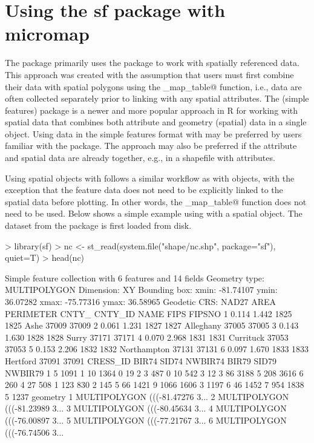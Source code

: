 \documentclass{article}
\begin{document}
\section{Using the sf package with micromap}

The \verb@micromap@ package primarily uses the \verb@sp@ package to work with spatially referenced data. This approach was created with the assumption that \verb@micromap@ users must first combine their data with spatial polygons using the \verb@create_map_table@ function, i.e., data are often collected separately prior to linking with any spatial attributes. The \verb@sf@ (simple features) package is a newer and more popular approach in R for working with spatial data that combines both attribute and geometry (spatial) data in a single object. Using data in the simple features format with \verb@micromap@ may be preferred by users familiar with the package.  The approach may also be preferred if the attribute and spatial data are already together, e.g., in a shapefile with attributes.

Using \verb@sf@ spatial objects with \verb@micromap@ follows a similar workflow as with \verb@sp@ objects, with the exception that the feature data does not need to be explicitly linked to the spatial data before plotting.  In other words, the \verb@create_map_table@ function does not need to be used.  Below shows a simple example using \verb@micromap@ with a \verb@sf@ spatial object. The \verb@nc@ dataset from the \verb@sf@ package is first loaded from disk. 

\begin{Schunk}
\begin{Sinput}
> library(sf)
> nc <- st_read(system.file("shape/nc.shp", package="sf"), quiet=T)
> head(nc)
\end{Sinput}
\begin{Soutput}
Simple feature collection with 6 features and 14 fields
Geometry type: MULTIPOLYGON
Dimension:     XY
Bounding box:  xmin: -81.74107 ymin: 36.07282 xmax: -75.77316 ymax: 36.58965
Geodetic CRS:  NAD27
   AREA PERIMETER CNTY_ CNTY_ID        NAME  FIPS FIPSNO
1 0.114     1.442  1825    1825        Ashe 37009  37009
2 0.061     1.231  1827    1827   Alleghany 37005  37005
3 0.143     1.630  1828    1828       Surry 37171  37171
4 0.070     2.968  1831    1831   Currituck 37053  37053
5 0.153     2.206  1832    1832 Northampton 37131  37131
6 0.097     1.670  1833    1833    Hertford 37091  37091
  CRESS_ID BIR74 SID74 NWBIR74 BIR79 SID79 NWBIR79
1        5  1091     1      10  1364     0      19
2        3   487     0      10   542     3      12
3       86  3188     5     208  3616     6     260
4       27   508     1     123   830     2     145
5       66  1421     9    1066  1606     3    1197
6       46  1452     7     954  1838     5    1237
                        geometry
1 MULTIPOLYGON (((-81.47276 3...
2 MULTIPOLYGON (((-81.23989 3...
3 MULTIPOLYGON (((-80.45634 3...
4 MULTIPOLYGON (((-76.00897 3...
5 MULTIPOLYGON (((-77.21767 3...
6 MULTIPOLYGON (((-76.74506 3...
\end{Soutput}
\end{Schunk}
\end{document}
